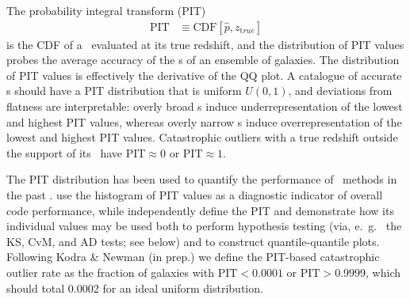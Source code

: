 The probability integral transform (PIT)
\begin{align}
\label{eq:pit}
\mathrm{PIT} &\equiv \mathrm{CDF}[\hat{p}, z_{\mathrm true}]
\end{align}
is the CDF of a \pzpdf\ evaluated at its true redshift, and the distribution of PIT values probes the average accuracy of the \pzpdf s of an ensemble of galaxies.
The distribution of PIT values is effectively the derivative of the QQ plot.
A catalogue of accurate \pzpdf s should have a PIT distribution that is uniform $U(0,1)$, and deviations from flatness are interpretable: overly broad \pzpdf s induce underrepresentation of the lowest and highest PIT values, whereas overly narrow \pzpdf s induce overrepresentation of the lowest and highest PIT values.
Catastrophic outliers with a true redshift outside the support of its \pzpdf\ have $\mathrm{PIT} \approx 0$ or $\mathrm{PIT} \approx 1$.

The PIT distribution has been used to quantify the performance of \pzpdf\ methods in the past \citep[e.~g.~][]{Bordoloi:10,Polsterer:16,Tanaka:17}.
\citet{Tanaka:17} use the histogram of PIT values as a diagnostic indicator of overall code performance, while \citet{Freeman:17} independently define the PIT and demonstrate how its individual values may be used both to perform hypothesis testing (via, e.~g.~ the KS, CvM, and AD tests; see below) and to construct quantile-quantile plots.
Following Kodra \& Newman (in prep.) we define the PIT-based catastrophic outlier rate as the fraction of galaxies with $\mathrm{PIT} < 0.0001$ or $\mathrm{PIT} > 0.9999$, which should total 0.0002 for an ideal uniform distribution.


